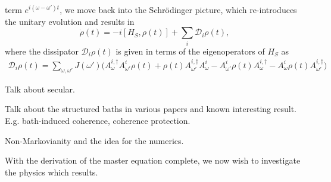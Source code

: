 \documentclass[11pt,a4paper,article,oneside]{memoir}
\begin{document}
term $e^{i(\omega-\omega')t}$, we move back into the Schr\"odinger
picture, which re-introduces the unitary evolution and results in
\begin{equation}
\dot{\rho}(t) = -i[H_S,\rho(t)] + \sum_i
\mathcal{D}_i\rho(t),
\label{eqn:mstr}
\end{equation}
where the dissipator $\mathcal{D}_i\rho(t)$ is given in terms
of the eigenoperators of $H_S$ as
\begin{align}
\mathcal{D}_i\rho(t)=\sum_{\omega,\omega'}J(\omega')\Big(
A^{i,\dagger}_\omega A^{i}_{\omega'}\rho(t) + \rho(t)
A^{i,\dagger}_{\omega'}A^{i}_{\omega} -
A^{i}_{\omega'}\rho(t)A^{i,\dagger}_\omega-A^{i}_{\omega}\rho(t)A^{i,\dagger}_{\omega'}\Big)
\end{align}
\color{red} \par Talk about secular. \par Talk about the structured
baths in various papers and known interesting
result. E.g. bath-induced coherence, coherence protection.  \par
Non-Markovianity and the idea for the numerics.  \color{black} \par
With the derivation of the master equation complete, we now wish to
investigate the physics which results.
\end{document}
